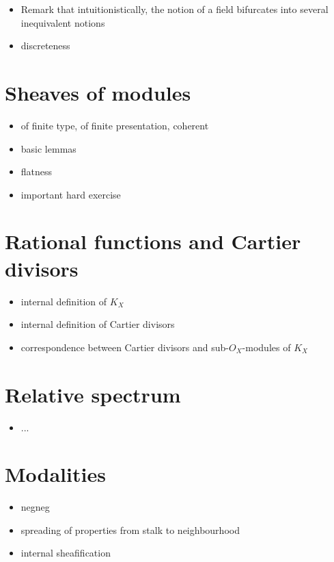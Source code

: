 \documentclass[10pt]{amsart}
\theoremstyle{definition}
\theoremstyle{plain}
\theoremstyle{remark}
\newcommand{\?}{\,{:}\,}
\renewcommand{\_}{\mathpunct{.}\,}
\begin{document}
\begin{itemize}
\item Remark that intuitionistically, the notion of a field bifurcates into
several inequivalent notions
\item discreteness
\end{itemize}

\section{Sheaves of modules}
\begin{itemize}
\item of finite type, of finite presentation, coherent
\item basic lemmas
\item flatness
\item important hard exercise
\end{itemize}

\section{Rational functions and Cartier divisors}
\begin{itemize}
\item internal definition of $K_X$
\item internal definition of Cartier divisors
\item correspondence between Cartier divisors and sub-$O_X$-modules of $K_X$
\end{itemize}

\section{Relative spectrum}
\begin{itemize}
\item ...
\end{itemize}

\section{Modalities}
\begin{itemize}
\item negneg
\item spreading of properties from stalk to neighbourhood
\item internal sheafification
\end{itemize}
\end{document}
